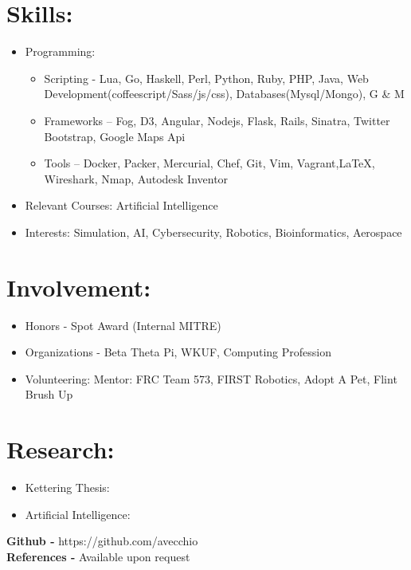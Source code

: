 \documentclass{res}
\begin{document}
\section{Skills:}
\begin{itemize}
\item Programming:
\begin{itemize}[label=$\circ$]
\item Scripting - Lua, Go, Haskell, Perl, Python, Ruby, PHP, Java, Web Development(coffeescript/Sass/js/css), Databases(Mysql/Mongo), G \& M
\item Frameworks – Fog, D3, Angular, Nodejs, Flask, Rails, Sinatra, Twitter Bootstrap, Google Maps Api
\item Tools – Docker, Packer, Mercurial, Chef, Git, Vim, Vagrant,\LaTeX, Wireshark, Nmap, Autodesk Inventor
\end{itemize}
\item Relevant Courses: Artificial Intelligence
\item Interests: Simulation, AI, Cybersecurity, Robotics, Bioinformatics, Aerospace
\end{itemize}

\section{Involvement:}
\begin{itemize}
\item Honors - Spot Award (Internal MITRE)
\item Organizations - Beta Theta Pi, WKUF, Computing Profession
\item Volunteering: Mentor: FRC Team 573, FIRST Robotics, Adopt A Pet, Flint Brush Up
\end{itemize}

\section{Research:}
\begin{itemize}
\item Kettering Thesis: 
\item Artificial Intelligence:
\end{itemize}

\begin{center}
\textbf{Github - }https://github.com/avecchio\\
\textbf{References - }Available upon request
\end{center}
\end{document}
